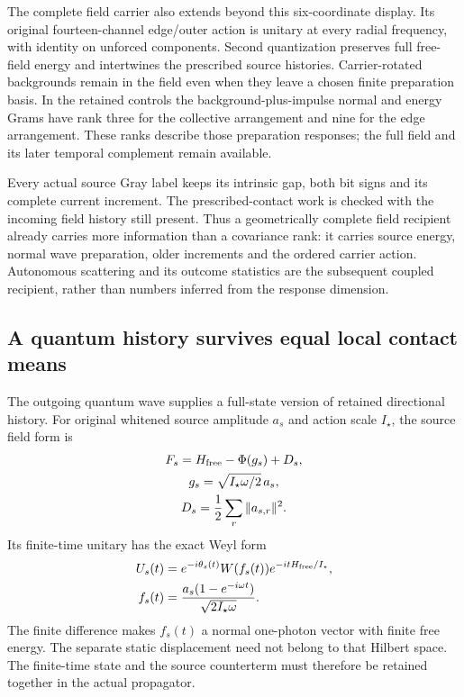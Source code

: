 The complete field carrier also extends beyond this six-coordinate display. Its original fourteen-channel edge/outer action is unitary at every radial frequency, with identity on unforced components. Second quantization preserves full free-field energy and intertwines the prescribed source histories. Carrier-rotated backgrounds remain in the field even when they leave a chosen finite preparation basis. In the retained controls the background-plus-impulse normal and energy Grams have rank three for the collective arrangement and nine for the edge arrangement. These ranks describe those preparation responses; the full field and its later temporal complement remain available.

Every actual source Gray label keeps its intrinsic gap, both bit signs and its complete current increment. The prescribed-contact work is checked with the incoming field history still present. Thus a geometrically complete field recipient already carries more information than a covariance rank: it carries source energy, normal wave preparation, older increments and the ordered carrier action. Autonomous scattering and its outcome statistics are the subsequent coupled recipient, rather than numbers inferred from the response dimension.

\subsection{A quantum history survives equal local contact means}

The outgoing quantum wave supplies a full-state version of retained directional history. For original whitened source amplitude $a_s$ and action scale $I_\star$, the source field form is
\begin{equation}
\begin{gathered}
 F_s=H_{\rm free}-\Phi(g_s)+D_s,\\
 g_s=\sqrt{I_\star\omega/2}\,a_s,\\
 D_s=\frac12\sum_r\|a_{s,r}\|^2.
\end{gathered}
\end{equation}
Its finite-time unitary has the exact Weyl form
\begin{align}
 U_s(t)&=e^{-i\theta_s(t)}W(f_s(t))e^{-itH_{\rm free}/I_\star},\\
 f_s(t)&=\frac{a_s(1-e^{-i\omega t})}{\sqrt{2I_\star\omega}}.
\end{align}
The finite difference makes $f_s(t)$ a normal one-photon vector with finite free energy. The separate static displacement need not belong to that Hilbert space. The finite-time state and the source counterterm must therefore be retained together in the actual propagator.

